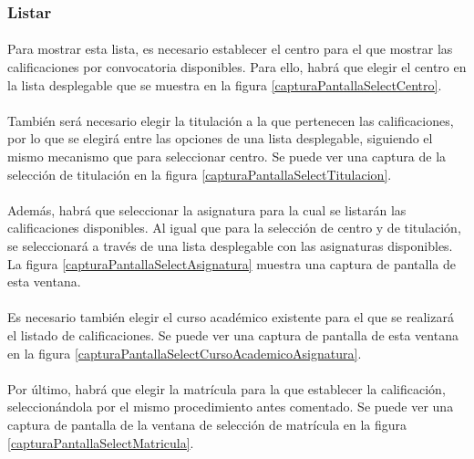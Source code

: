 \subsubsection{Listar}

  \paragraph{}Para mostrar esta lista, es necesario establecer el centro para
  el que mostrar las calificaciones por convocatoria disponibles. Para ello,
  habrá que elegir el centro en la lista desplegable que se muestra en la figura
  \ref{capturaPantallaSelectCentro}.

  \paragraph{}También será necesario elegir la titulación a la que pertenecen
  las calificaciones, por lo que se elegirá entre las opciones de una lista
  desplegable, siguiendo el mismo mecanismo que para seleccionar centro. Se
  puede ver una captura de la selección de titulación en la figura
  \ref{capturaPantallaSelectTitulacion}.

  \paragraph{}Además, habrá que seleccionar la asignatura para la cual se
  listarán las calificaciones disponibles. Al igual que para la selección de
  centro y de titulación, se seleccionará a través de una lista desplegable con
  las asignaturas disponibles. La figura \ref{capturaPantallaSelectAsignatura}
  muestra una captura de pantalla de esta ventana.

  \paragraph{}Es necesario también elegir el curso académico existente para el
  que se realizará el listado de calificaciones. Se puede ver una captura de
  pantalla de esta ventana en la figura
  \ref{capturaPantallaSelectCursoAcademicoAsignatura}.

  \paragraph{}Por último, habrá que elegir la matrícula para la que establecer
  la calificación, seleccionándola por el mismo procedimiento antes comentado.
  Se puede ver una captura de pantalla de la ventana de selección de matrícula
  en la figura \ref{capturaPantallaSelectMatricula}.

